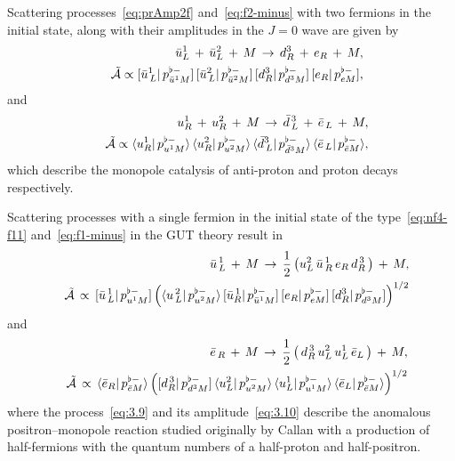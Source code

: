 \documentclass[a4paper,11pt]{article}
\begin{document}
Scattering processes~\eqref{eq:prAmp2f}  and~\eqref{eq:f2-minus} with two fermions in the initial state, along with their amplitudes in the $J=0$ wave are given by
\begin{eqnarray}
\label{eq:3.5}
 &&\bar{u}^{1}_{L} \,+\,\bar{u}^{2}_{L}\,+\,  M \,\to\, d^3_{R} \,+\, {e}_{R} \,+\,  M,
\\
\label{eq:3.6}
 &&\tilde{\cal A}
 \propto
 [\bar{u}_{\,L}^{1} | \, p^{\flat -}_{\bar{u}^{1} M} ]\,  [\bar{u}_{\,L}^{2}| \, p^{\flat -}_{\bar{u}^{2} M} ]\,
 [d_R^{3} | \, p^{\flat -}_{d^3 M} ]\,
    [e_R | \, p^{\flat -}_{{e} M} ],
    \end{eqnarray} 
and 
\begin{eqnarray}
\label{eq:3.3}
&& u^{1}_{R} \,+\, u^{2}_{R} \,+\, M \,\to\,   
\bar{d}^{\,3}_{\,L}\,+\,\bar{e}_{\,L}\,+\, M,\\
\label{eq:3.4}
 &&\tilde{\cal A} 
 \propto
 \langle u_R^{1} | \, p^{\flat -}_{u^{1} M} \rangle\,  \langle u_R^{2} | \, p^{\flat -}_{u^{2} M} \rangle\, 
 \langle \bar{d}_{\,L}^{3} | \, p^{\flat -}_{\bar{d}^3 M} \rangle\,
    \langle\bar{e}_{\,L} | \, p^{\flat -}_{\bar{e} M} \rangle,
\end{eqnarray} 
which describe the monopole catalysis of anti-proton and proton decays respectively.

Scattering processes with a single fermion in the initial state of the type~\eqref{eq:nf4-f11} and~\eqref{eq:f1-minus} in the GUT theory result in 
\begin{eqnarray}
\label{eq:3.7}
 &&\bar{u}_{\,L}^{\,1} \,+\,  M \,\to\, \frac{1}{2} \left(u_{L}^2\,
  \bar{u}_{\,R}^{\,1} \,
 e_{R} \,
 d_{R}^{\,3} \,\right) \,+\,  M,\\
 \label{3.8}
 &&\tilde{\cal A}
 \, \propto\, 
  [\bar{u}_{\,L}^{\,1}  | \,p^{\flat -}_{{u}^1 M} ]
  \left(
  \langle {u}_{\,L}^{\,2} | \,p^{\flat -}_{{u}^2 M} \rangle\,
  [\bar{u}_{R}^{\,1} | \, p^{\flat -}_{\bar{u}^1 M} ]\,
   [e_{R} | \, p^{\flat -}_{e M} ]\,
    [d_{R}^{3} | \, p^{\flat -}_{d^3 M} ]
  \right)^{1/2}
\end{eqnarray} 
and 
\begin{eqnarray}
\label{eq:3.9}
&& \bar{e}_{\,R} \,+\, M \,\to\, \frac{1}{2} \left(
 \,d_{R}^{\,3} \,
 u_{L}^2\,u_{L}^1\,\bar{e}_{L}
   \,\right) \,+\,  M,\\
\label{eq:3.10}
&&\tilde{\cal A}
 \, \propto\, 
  \langle \bar{e}_{R} | \, p^{\flat -}_{\bar{e} M} \rangle
  \left(
  [ d_{R}^{\,3} | \,p^{\flat -}_{d^3 M} ]\,
  \langle u^2_L | \, p^{\flat -}_{u^2 M} \rangle\,
   \langle u^1_L | \, p^{\flat -}_{u^1 M} \rangle\,
    \langle\bar{e}_{L} | \, p^{\flat -}_{\bar{e} M} \rangle
  \right)^{1/2}
\end{eqnarray} 
where the process~\eqref{eq:3.9} and its amplitude~\eqref{eq:3.10} describe the anomalous positron--monopole reaction studied originally by Callan 
with a production of 
half-fermions with the quantum numbers of a half-proton and half-positron.
\end{document}
